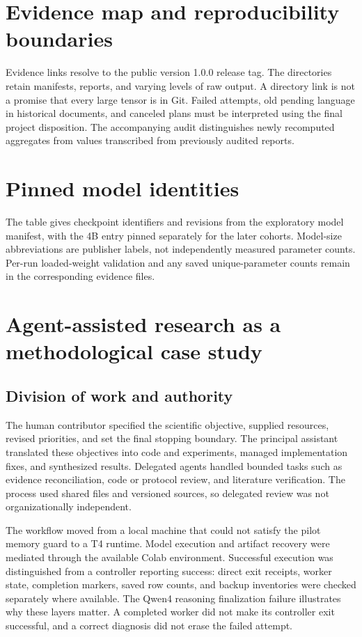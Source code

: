 \documentclass[11pt,letterpaper]{article}
\begin{document}


\appendix
\section{Evidence map and reproducibility boundaries}\label{app:evidence}
Evidence links resolve to the public version 1.0.0 release tag. The directories retain manifests, reports, and varying levels of raw output. A directory link is not a promise that every large tensor is in Git. Failed attempts, old pending language in historical documents, and canceled plans must be interpreted using the final project disposition. The accompanying audit distinguishes newly recomputed aggregates from values transcribed from previously audited reports.


\section{Pinned model identities}\label{app:models}

The table gives checkpoint identifiers and revisions from the exploratory model manifest, with the 4B entry pinned separately for the later cohorts. Model-size abbreviations are publisher labels, not independently measured parameter counts. Per-run loaded-weight validation and any saved unique-parameter counts remain in the corresponding evidence files.

\section{Agent-assisted research as a methodological case study}\label{app:agents}
\subsection{Division of work and authority}
The human contributor specified the scientific objective, supplied resources, revised priorities, and set the final stopping boundary. The principal assistant translated these objectives into code and experiments, managed implementation fixes, and synthesized results. Delegated agents handled bounded tasks such as evidence reconciliation, code or protocol review, and literature verification. The process used shared files and versioned sources, so delegated review was not organizationally independent.

The workflow moved from a local machine that could not satisfy the pilot memory guard to a T4 runtime. Model execution and artifact recovery were mediated through the available Colab environment. Successful execution was distinguished from a controller reporting success: direct exit receipts, worker state, completion markers, saved row counts, and backup inventories were checked separately where available. The Qwen4 reasoning finalization failure illustrates why these layers matter. A completed worker did not make its controller exit successful, and a correct diagnosis did not erase the failed attempt.
\end{document}
